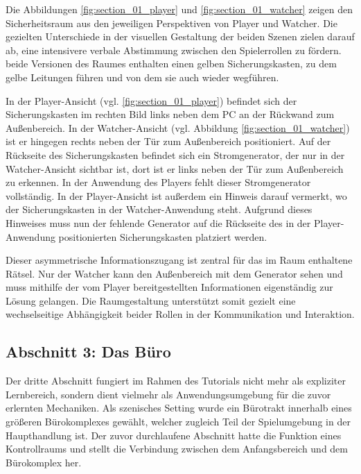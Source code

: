 Die Abbildungen \ref{fig:section_01_player} und \ref{fig:section_01_watcher} zeigen den Sicherheitsraum aus den jeweiligen Perspektiven von Player und Watcher. Die gezielten Unterschiede in der visuellen Gestaltung der beiden Szenen zielen darauf ab, eine intensivere verbale Abstimmung zwischen den Spielerrollen zu fördern. beide Versionen des Raumes enthalten einen gelben Sicherungskasten, zu dem gelbe Leitungen führen und von dem sie auch wieder wegführen.

In der Player-Ansicht (vgl. \ref{fig:section_01_player}) befindet sich der Sicherungskasten im rechten Bild links neben dem PC an der Rückwand zum Außenbereich. In der Watcher-Ansicht (vgl. Abbildung \ref{fig:section_01_watcher}) ist er hingegen rechts neben der Tür zum Außenbereich positioniert. Auf der Rückseite des Sicherungskasten befindet sich ein Stromgenerator, der nur in der Watcher-Ansicht sichtbar ist, dort ist er links neben der Tür zum Außenbereich zu erkennen. In der Anwendung des Players fehlt dieser Stromgenerator vollständig. In der Player-Ansicht ist außerdem ein Hinweis darauf vermerkt, wo der Sicherungskasten in der Watcher-Anwendung steht. Aufgrund dieses Hinweises muss nun der fehlende Generator auf die Rückseite des in der Player-Anwendung positionierten Sicherungskasten platziert werden.

Dieser asymmetrische Informationszugang ist zentral für das im Raum enthaltene Rätsel. Nur der Watcher kann den Außenbereich mit dem Generator sehen und muss mithilfe der vom Player bereitgestellten Informationen eigenständig zur Lösung gelangen. Die Raumgestaltung unterstützt somit gezielt eine wechselseitige Abhängigkeit beider Rollen in der Kommunikation und Interaktion.

\subsection{Abschnitt 3: Das Büro}

Der dritte Abschnitt fungiert im Rahmen des Tutorials nicht mehr als expliziter Lernbereich, sondern dient vielmehr als Anwendungsumgebung für die zuvor erlernten Mechaniken. Als szenisches Setting wurde ein Bürotrakt innerhalb eines größeren Bürokomplexes gewählt, welcher zugleich Teil der Spielumgebung in der Haupthandlung ist. Der zuvor durchlaufene Abschnitt hatte die Funktion eines Kontrollraums und stellt die Verbindung zwischen dem Anfangsbereich und dem Bürokomplex her.

